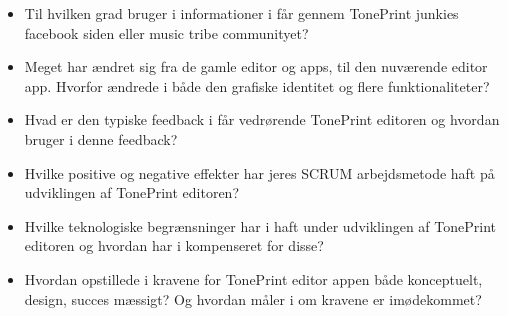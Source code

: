 \begin{itemize}
  \item Til hvilken grad bruger i informationer i får gennem TonePrint junkies facebook siden eller music tribe communityet?
  \item Meget har ændret sig fra de gamle editor og apps, til den nuværende editor app. Hvorfor ændrede i både den grafiske identitet og flere funktionaliteter?
  \item Hvad er den typiske feedback i får vedrørende TonePrint editoren og hvordan bruger i denne feedback?
  \item Hvilke positive og negative effekter har jeres SCRUM arbejdsmetode haft på udviklingen af TonePrint editoren?
  \item Hvilke teknologiske begrænsninger har i haft under udviklingen af TonePrint editoren og hvordan har i kompenseret for disse?
  \item Hvordan opstillede i kravene for TonePrint editor appen både konceptuelt, design, succes mæssigt? Og hvordan måler i om kravene er imødekommet?
\end{itemize}
%
%
%
